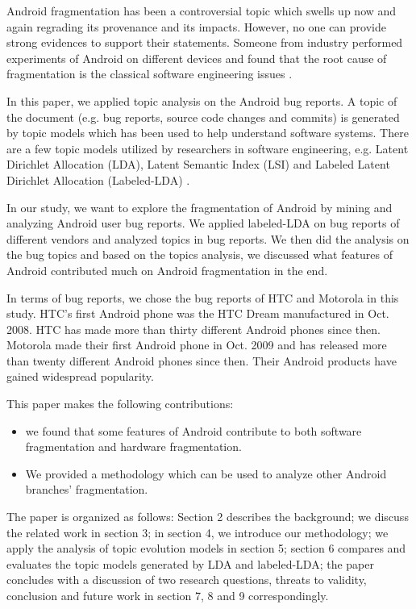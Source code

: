 \documentclass[10pt, conference, compsocconf]{IEEEtran}
\begin{document}
Android fragmentation has been a controversial topic which swells up now and again regrading its provenance and its impacts.  However, no one can provide strong evidences to support their statements. Someone from industry performed experiments of Android on different devices and found that the root cause of fragmentation is the classical software engineering issues \cite{testing}.

In this paper, we applied topic analysis on the Android bug reports. A topic of the document (e.g. bug reports, source code changes and commits) is generated by topic models which has been used to help understand software systems. There are a few topic models utilized by researchers in software engineering, e.g. Latent Dirichlet Allocation (LDA), Latent Semantic Index (LSI) and Labeled Latent Dirichlet Allocation (Labeled-LDA) \cite{Marcus04aninformation} \cite{Asuncion:2010} \cite{Linstead:2009}.

In our study, we want to explore the fragmentation of Android by mining and analyzing Android user bug reports. We applied labeled-LDA\cite{labeledlda} on bug reports of different vendors and analyzed topics in bug reports. We then did the analysis on the bug topics and based on the topics analysis, we discussed what features of Android contributed much on Android fragmentation in the end. 

In terms of bug reports, we chose the bug reports of HTC and Motorola in this study. HTC’s first Android phone was the HTC Dream manufactured in Oct. 2008. HTC has made more than thirty different Android phones since then. Motorola made their first Android phone in Oct. 2009 and has released more than twenty different Android phones since then. Their Android products have gained widespread popularity. 
 
This paper makes the following contributions:
\begin{itemize}
\item we found that some features of Android contribute to both software fragmentation  and hardware fragmentation.
\end{itemize}

\begin{itemize}
\item We provided a methodology which can be used to analyze other Android branches' fragmentation. 
\end{itemize}

The paper is organized as follows: Section 2 describes the background; we discuss the related work in section 3; in section 4, we introduce our methodology; we apply the analysis of topic evolution models in section 5; section 6 compares and evaluates the topic models generated by LDA and labeled-LDA;  the paper concludes with a discussion of two research questions, threats to validity, conclusion and future work in section 7, 8 and 9 correspondingly. 
\end{document}
